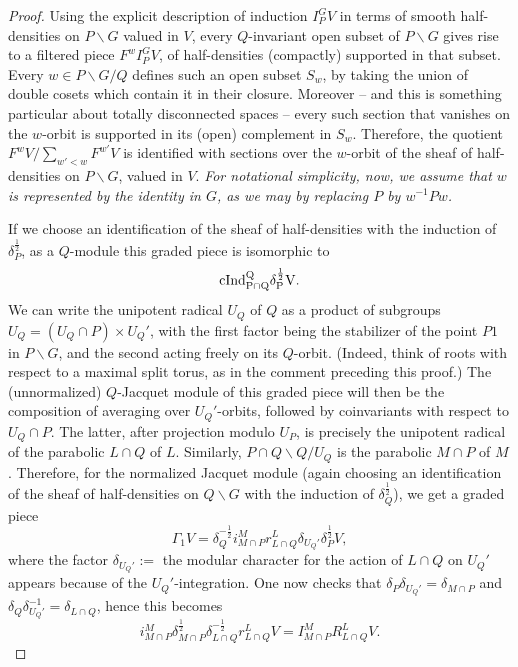 \begin{proof}
	Using the explicit description of induction $I_P^G V$ in terms of smooth half-densities on $P\backslash G$ valued in $V$, every $Q$-invariant open subset of $P\backslash G$ gives rise to a filtered piece $F^w I_P^GV$, of half-densities (compactly) supported in that subset. Every $w\in P\backslash G/Q$ defines such an open subset $S_w$, by taking the union of double cosets which contain it in their closure. Moreover -- and this is something particular about totally disconnected spaces -- every such section that vanishes on the $w$-orbit is supported in its (open) complement in $S_w$. Therefore, the quotient $F^w V/\sum_{w'<w} F^{w'} V$ is identified with sections over the $w$-orbit of the sheaf of half-densities on $P\backslash G$, valued in $V$. \emph{For notational simplicity, now, we assume that $w$ is represented by the identity in $G$, as we may by replacing $P$ by $w^{-1}Pw$.}	

	If we choose an identification of the sheaf of half-densities with the induction of $\delta_P^{\frac{1}{2}}$, as a $Q$-module this graded piece is isomorphic to 
	$$ \rm{cInd}_{P\cap Q}^Q \delta_P^{\frac{1}{2}} V.$$
	We can write the unipotent radical $U_Q$ of $Q$ as a product of subgroups $U_Q = (U_Q\cap P) \times  U_Q'$, with the first factor being the stabilizer of the point $P1$ in $P\backslash G$, and the second acting freely on its $Q$-orbit. (Indeed, think of roots with respect to a maximal split torus, as in the comment preceding this proof.) The (unnormalized) $Q$-Jacquet module of this graded piece will then be the composition of averaging over $U_Q'$-orbits, followed by coinvariants with respect to $U_Q\cap P$. The latter, after projection modulo $U_P$, is precisely the unipotent radical of the parabolic $L\cap Q$ of $L$. Similarly, $P\cap Q\backslash Q/U_Q$ is the parabolic $M\cap P$ of $M$. Therefore, for the normalized Jacquet module (again choosing an identification of the sheaf of half-densities on $Q\backslash G$ with the induction of $\delta_Q^{\frac{1}{2}}$), we get a graded piece 
	$$ \Gamma_1 V =  \delta_Q^{-\frac{1}{2}}  i^M_{M\cap P}  r^{L}_{L\cap Q} \delta_{U_Q'} \delta_P^{\frac{1}{2}} V,$$
	where the factor $\delta_{U_Q'} :=$ the modular character for the action of $L\cap Q$ on $U_Q'$ appears because of the $U_Q'$-integration. One now checks that $\delta_P \delta_{U_Q'} = \delta_{M\cap P}$ and $\delta_Q \delta_{U_Q'}^{-1} = \delta_{L\cap Q}$, hence this becomes 
	$$  i^M_{M\cap P} \delta_{M\cap P}^{\frac{1}{2}}  \delta_{L\cap Q}^{-\frac{1}{2}}  r^{L}_{L\cap Q}   V = I^M_{M\cap P} R^L_{L\cap Q} V.$$
\end{proof}

